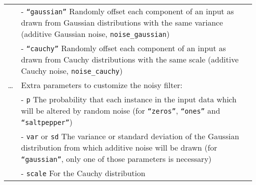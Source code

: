 \begin{longtable}[c]{@{}>{\small}p{3cm}>{\raggedright}p{12.5cm}@{}}
\begin{minipage}[t]{0.07\columnwidth}
\strut\end{minipage} &
\begin{minipage}[t]{0.87\columnwidth}\raggedright\strut
- \texttt{``gaussian''} Randomly offset each component of an input as
drawn from Gaussian distributions with the same variance (additive
Gaussian noise, \texttt{noise\_gaussian})
\strut\end{minipage}\tabularnewline
\begin{minipage}[t]{0.07\columnwidth}\raggedright\strut
\strut\end{minipage} &
\begin{minipage}[t]{0.87\columnwidth}\raggedright\strut
- \texttt{``cauchy''} Randomly offset each component of an input as drawn
from Cauchy distributions with the same scale (additive Cauchy noise,
\texttt{noise\_cauchy})
\strut\end{minipage}\tabularnewline
\begin{minipage}[t]{0.07\columnwidth}\raggedright\strut
\ldots{}
\strut\end{minipage} &
\begin{minipage}[t]{0.87\columnwidth}\raggedright\strut
Extra parameters to customize the noisy filter:
\strut\end{minipage}\tabularnewline
\begin{minipage}[t]{0.07\columnwidth}\raggedright\strut
\strut\end{minipage} &
\begin{minipage}[t]{0.87\columnwidth}\raggedright\strut
- \texttt{p} The probability that each instance in the input data which
will be altered by random noise (for \texttt{``zeros''}, \texttt{``ones''}
and \texttt{``saltpepper''})
\strut\end{minipage}\tabularnewline
\begin{minipage}[t]{0.07\columnwidth}\raggedright\strut
\strut\end{minipage} &
\begin{minipage}[t]{0.87\columnwidth}\raggedright\strut
- \texttt{var} or \texttt{sd} The variance or standard deviation of the
Gaussian distribution from which additive noise will be drawn (for
\texttt{``gaussian''}, only one of those parameters is necessary)
\strut\end{minipage}\tabularnewline
\begin{minipage}[t]{0.07\columnwidth}\raggedright\strut
\strut\end{minipage} &
\begin{minipage}[t]{0.87\columnwidth}\raggedright\strut
- \texttt{scale} For the Cauchy distribution
\strut\end{minipage}\tabularnewline
\bottomrule
\end{longtable}

